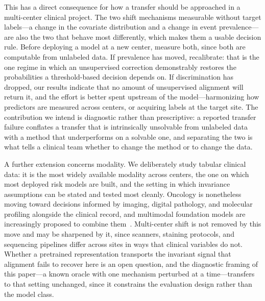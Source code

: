 This has a direct consequence for how a transfer should be approached in a
multi-center clinical project. The two shift mechanisms measurable without
target labels---a change in the covariate distribution and a change in event
prevalence---are also the two that behave most differently, which makes them a
usable decision rule. Before deploying a model at a new center, measure both,
since both are computable from unlabeled data. If prevalence has moved,
recalibrate: that is the one regime in which an unsupervised correction
demonstrably restores the probabilities a threshold-based decision depends on.
If discrimination has dropped, our results indicate that no amount of
unsupervised alignment will return it, and the effort is better spent upstream
of the model---harmonizing how predictors are measured across centers, or
acquiring labels at the target site. The contribution we intend is diagnostic
rather than prescriptive: a reported transfer failure conflates a transfer that
is intrinsically unsolvable from unlabeled data with a method that
underperforms on a solvable one, and separating the two is what tells a clinical
team whether to change the method or to change the data.

A further extension concerns modality. We deliberately study tabular clinical
data: it is the most widely available modality across centers, the one on which
most deployed risk models are built, and the setting in which invariance
assumptions can be stated and tested most cleanly. Oncology is nonetheless
moving toward decisions informed by imaging, digital pathology, and molecular
profiling alongside the clinical record, and multimodal foundation models are
increasingly proposed to combine
them~\cite{wang2024pathologyfm,xiang2025visionlanguage,ding2025wsifm}.
Multi-center shift is not removed by this move and may be sharpened by it, since
scanners, staining protocols, and sequencing pipelines differ across sites in
ways that clinical variables do not. Whether a pretrained representation
transports the invariant signal that alignment fails to recover here is an open
question, and the diagnostic framing of this paper---a known oracle with one
mechanism perturbed at a time---transfers to that setting unchanged, since it
constrains the evaluation design rather than the model class.



